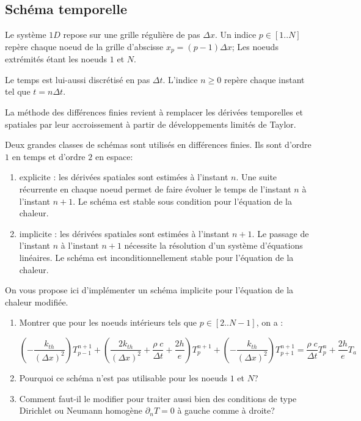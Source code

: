 \documentclass[a4paper, 10pt]{article}
\begin{document}
\subsection{Schéma temporelle}

Le système $1D$ repose sur une grille régulière de pas $\Delta x$.  Un indice $p \in [1..N]$ 
repère chaque noeud de la grille d'abscisse $x_p=(p-1) \Delta x$;  Les noeuds extrémités
étant les noeuds $1$ et $N$.  

Le temps est lui-aussi discrétisé en pas $\Delta t$. L'indice $n \ge 0$ repère chaque instant tel que
$t=n \Delta t$. 

La méthode des différences finies revient à remplacer les dérivées temporelles et spatiales par
leur accroissement à partir de développements limités de Taylor.

Deux grandes classes de schémas sont utilisés en différences finies. Ils sont d'ordre $1$ en temps et d'ordre $2$ en espace:
\begin{enumerate}
\item explicite : les dérivées spatiales sont estimées à l'instant $n$. Une suite récurrente en chaque
noeud permet de faire évoluer le temps de l'instant $n$ à l'instant $n+1$. Le schéma est stable
sous condition pour l'équation de la chaleur.  
\item implicite :  les dérivées spatiales sont estimées à l'instant $n+1$. Le passage de l'instant
$n$ à l'instant $n+1$ nécessite la résolution d'un système d'équations linéaires. Le schéma
est inconditionnellement stable pour l'équation de la chaleur.
\end{enumerate}

On vous propose ici d'implémenter un schéma implicite pour l'équation de la chaleur modifiée.
\begin{enumerate}
\item Montrer que pour les noeuds intérieurs tels que $p \in [2..N-1]$, on a :

\begin{equation}\label{sch1}
\left( { - \frac{{k_{th}^{}}}{{{{\left( {\Delta x} \right)}^2}}}} \right)T_{p - 1}^{n + 1} + \left( {\frac{{2k_{th}^{}}}{{{{\left( {\Delta x} \right)}^2}}} + \frac{{\rho \;c}}{{\Delta t}} + \frac{{2h}}{e}} \right)T_p^{n + 1} + \left( { - \frac{{k_{th}^{}}}{{{{\left( {\Delta x} \right)}^2}}}} \right)T_{p + 1}^{n + 1} = \frac{{\rho \;c}}{{\Delta t}}T_p^n  + \frac{{2h}}{e}{T_a}
\end{equation}

\item Pourquoi ce schéma n'est pas utilisable pour les noeuds $1$ et $N$? 
\item Comment faut-il le modifier pour traiter aussi bien des conditions de type Dirichlet ou Neumann
homogène $\partial_n T=0$ à gauche comme à droite?

\end{enumerate}
\end{document}
